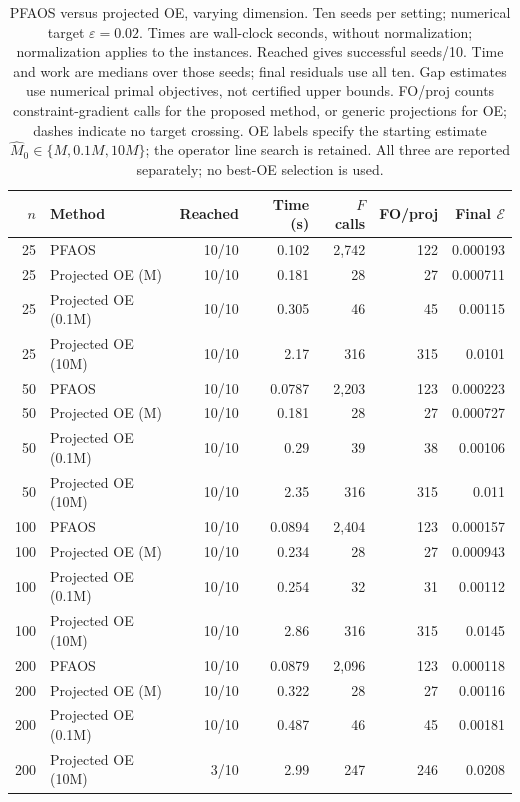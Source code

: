 \begin{table}[!htbp]
\centering\scriptsize
\caption{PFAOS versus projected OE, varying dimension. Ten seeds per setting; numerical target $\varepsilon=0.02$. Times are wall-clock seconds, without normalization; normalization applies to the instances. Reached gives successful seeds/10. Time and work are medians over those seeds; final residuals use all ten. Gap estimates use numerical primal objectives, not certified upper bounds. FO/proj counts constraint-gradient calls for the proposed method, or generic projections for OE; dashes indicate no target crossing. OE labels specify the starting estimate $\widehat M_0\in\{M,0.1M,10M\}$; the operator line search is retained. All three are reported separately; no best-OE selection is used.}
\label{tab:pfaos_numerical}
\begin{tabular}{r l r r r r r}
\hline
$n$ & Method & Reached & Time (s) & $F$ calls & FO/proj & Final $\mathcal E$ \\
\hline
25 & PFAOS & 10/10 & 0.102 & 2,742 & 122 & 0.000193 \\
25 & Projected OE (M) & 10/10 & 0.181 & 28 & 27 & 0.000711 \\
25 & Projected OE (0.1M) & 10/10 & 0.305 & 46 & 45 & 0.00115 \\
25 & Projected OE (10M) & 10/10 & 2.17 & 316 & 315 & 0.0101 \\
\hline
50 & PFAOS & 10/10 & 0.0787 & 2,203 & 123 & 0.000223 \\
50 & Projected OE (M) & 10/10 & 0.181 & 28 & 27 & 0.000727 \\
50 & Projected OE (0.1M) & 10/10 & 0.29 & 39 & 38 & 0.00106 \\
50 & Projected OE (10M) & 10/10 & 2.35 & 316 & 315 & 0.011 \\
\hline
100 & PFAOS & 10/10 & 0.0894 & 2,404 & 123 & 0.000157 \\
100 & Projected OE (M) & 10/10 & 0.234 & 28 & 27 & 0.000943 \\
100 & Projected OE (0.1M) & 10/10 & 0.254 & 32 & 31 & 0.00112 \\
100 & Projected OE (10M) & 10/10 & 2.86 & 316 & 315 & 0.0145 \\
\hline
200 & PFAOS & 10/10 & 0.0879 & 2,096 & 123 & 0.000118 \\
200 & Projected OE (M) & 10/10 & 0.322 & 28 & 27 & 0.00116 \\
200 & Projected OE (0.1M) & 10/10 & 0.487 & 46 & 45 & 0.00181 \\
200 & Projected OE (10M) & 3/10 & 2.99 & 247 & 246 & 0.0208 \\

\end{tabular}
\end{table}

